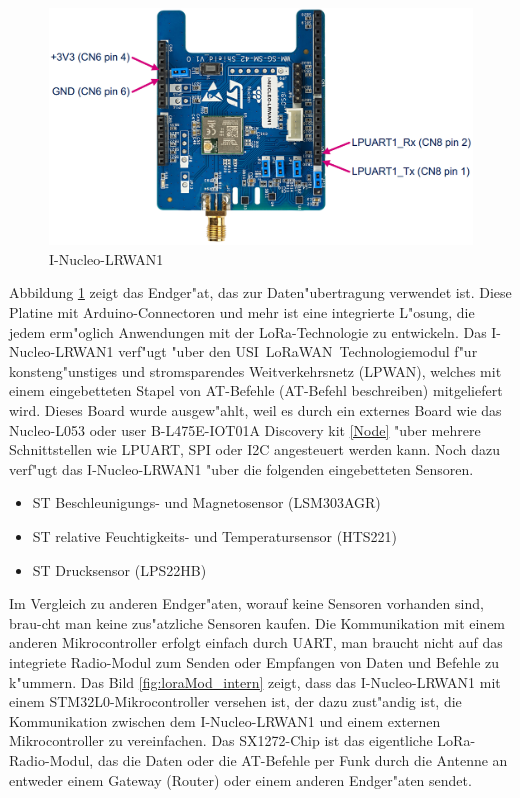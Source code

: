  
\begin{figure}[h]
	\centering
	\includegraphics[width=14cm]{source/images/LoRa_mod}
	\caption{I-Nucleo-LRWAN1 \cite{LoRaMod}\label{fig:loraMod}}
\end{figure}

Abbildung \ref{fig:loraMod} zeigt das Endger"at, das zur Daten"ubertragung verwendet ist. Diese Platine mit Arduino-Connectoren und mehr ist eine integrierte L"osung, die jedem erm"oglich Anwendungen mit der LoRa-Technologie zu entwickeln. Das I-Nucleo-LRWAN1 verf"ugt "uber den USI\textregistered\ LoRaWAN\texttrademark\ Technologiemodul f"ur konsteng"unstiges und stromsparendes Weitverkehrsnetz (LPWAN), welches mit einem eingebetteten Stapel von AT-Befehle (AT-Befehl beschreiben) mitgeliefert wird.
Dieses Board wurde ausgew"ahlt, weil es durch ein externes Board wie das Nucleo-L053 oder user B-L475E-IOT01A Discovery kit \ref{Node} "uber mehrere Schnittstellen wie LPUART, SPI oder I2C angesteuert werden kann. Noch dazu verf"ugt das I-Nucleo-LRWAN1 "uber die folgenden eingebetteten Sensoren.

\begin{itemize}
	\item ST Beschleunigungs- und Magnetosensor (LSM303AGR)
	\item ST relative Feuchtigkeits- und Temperatursensor (HTS221)
	\item ST Drucksensor (LPS22HB)
\end{itemize}

Im Vergleich zu anderen Endger"aten, worauf keine Sensoren vorhanden sind, brau-cht man keine zus"atzliche Sensoren kaufen. Die Kommunikation mit einem anderen Mikrocontroller erfolgt einfach durch UART, man braucht nicht auf das integriete Radio-Modul zum Senden oder Empfangen von Daten und Befehle zu k"ummern. Das Bild \ref{fig:loraMod_intern} zeigt, dass das I-Nucleo-LRWAN1 mit einem STM32L0-Mikrocontroller versehen ist, der dazu zust"andig ist, die Kommunikation zwischen dem I-Nucleo-LRWAN1 und einem externen Mikrocontroller zu vereinfachen. Das SX1272-Chip ist das eigentliche LoRa-Radio-Modul, das die Daten oder die AT-Befehle per Funk durch die Antenne an entweder einem Gateway (Router) oder einem anderen Endger"aten sendet. 

